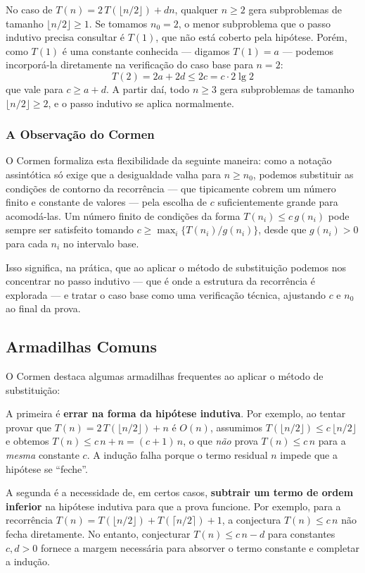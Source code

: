\documentclass[9pt,a4paper]{extarticle}
\begin{document}
No caso de $T(n) = 2\,T(\lfloor n/2 \rfloor) + dn$, qualquer $n \geq 2$ gera subproblemas de tamanho $\lfloor n/2 \rfloor \geq 1$. Se tomamos $n_0 = 2$, o menor subproblema que o passo indutivo precisa consultar é $T(1)$, que não está coberto pela hipótese. Porém, como $T(1)$ é uma constante conhecida --- digamos $T(1) = a$ --- podemos incorporá-la diretamente na verificação do caso base para $n = 2$:
%
\[
T(2) = 2a + 2d \leq 2c = c \cdot 2 \lg 2
\]
%
\noindent que vale para $c \geq a + d$. A partir daí, todo $n \geq 3$ gera subproblemas de tamanho $\lfloor n/2 \rfloor \geq 2$, e o passo indutivo se aplica normalmente.

\subsubsection{A Observação do Cormen}

O Cormen formaliza esta flexibilidade da seguinte maneira: como a notação assintótica só exige que a desigualdade valha para $n \geq n_0$, podemos substituir as condições de contorno da recorrência --- que tipicamente cobrem um número finito e constante de valores --- pela escolha de $c$ suficientemente grande para acomodá-las. Um número finito de condições da forma $T(n_i) \leq c\,g(n_i)$ pode sempre ser satisfeito tomando $c \geq \max_i \{T(n_i)/g(n_i)\}$, desde que $g(n_i) > 0$ para cada $n_i$ no intervalo base.

Isso significa, na prática, que ao aplicar o método de substituição podemos nos concentrar no passo indutivo --- que é onde a estrutura da recorrência é explorada --- e tratar o caso base como uma verificação técnica, ajustando $c$ e $n_0$ ao final da prova.

\subsection{Armadilhas Comuns}

O Cormen destaca algumas armadilhas frequentes ao aplicar o método de substituição:

A primeira é \textbf{errar na forma da hipótese indutiva}. Por exemplo, ao tentar provar que $T(n) = 2\,T(\lfloor n/2 \rfloor) + n$ é $O(n)$, assumimos $T(\lfloor n/2 \rfloor) \leq c\,\lfloor n/2 \rfloor$ e obtemos $T(n) \leq c\,n + n = (c+1)\,n$, o que \emph{não} prova $T(n) \leq c\,n$ para a \emph{mesma} constante $c$. A indução falha porque o termo residual $n$ impede que a hipótese se ``feche''.

A segunda é a necessidade de, em certos casos, \textbf{subtrair um termo de ordem inferior} na hipótese indutiva para que a prova funcione. Por exemplo, para a recorrência $T(n) = T(\lfloor n/2 \rfloor) + T(\lceil n/2 \rceil) + 1$, a conjectura $T(n) \leq c\,n$ não fecha diretamente. No entanto, conjecturar $T(n) \leq c\,n - d$ para constantes $c, d > 0$ fornece a margem necessária para absorver o termo constante e completar a indução.
\end{document}

